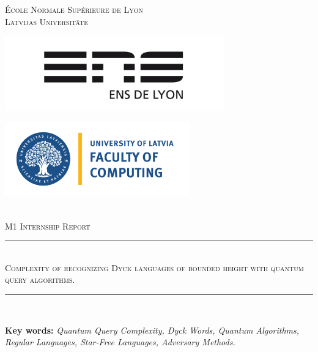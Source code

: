 \documentclass[11pt,a4paper]{article}
\newcommand{\HRule}{\rule{\linewidth}{0.5mm}}
\theoremstyle{definition}
\theoremstyle{plain}
\theoremstyle{definition}
\begin{document}
\begin{titlepage}
    \begin{sffamily}
        \begin{center}

            \textsc{\LARGE École Normale Supérieure de Lyon}\\[0.5cm]
            \textsc{\LARGE Latvijas Universitāte} \\[1cm]

            \begin{minipage}[c]{.46\linewidth}
                \hspace{-2cm}
                \includegraphics[width=9.5cm]{illustration/Logo_ENS_Lyon.png}
            \end{minipage}
            \hfill%
            \begin{minipage}[c]{.46\linewidth}
                \centering
                \includegraphics[width=8cm]{illustration/Faculty_of_Computing_University_of_Latvia-1536x619-1.png}
            \end{minipage}\\[1cm]

            \textsc{\Large M1 Internship Report}\\[1cm]

            \HRule \\[0.4cm]
            \textsc{\huge Complexity of recognizing Dyck languages
                of bounded height with quantum query algorithms.}
            \HRule \\[1cm]

            \begin{center}
                \textbf{Key words:} \textit{Quantum Query Complexity, Dyck Words,
                    Quantum Algorithms, Regular Languages, Star-Free Languages,
                    Adversary Methods.}
            \end{center}


\end{center}
\end{sffamily}
\end{titlepage}
\end{document}
